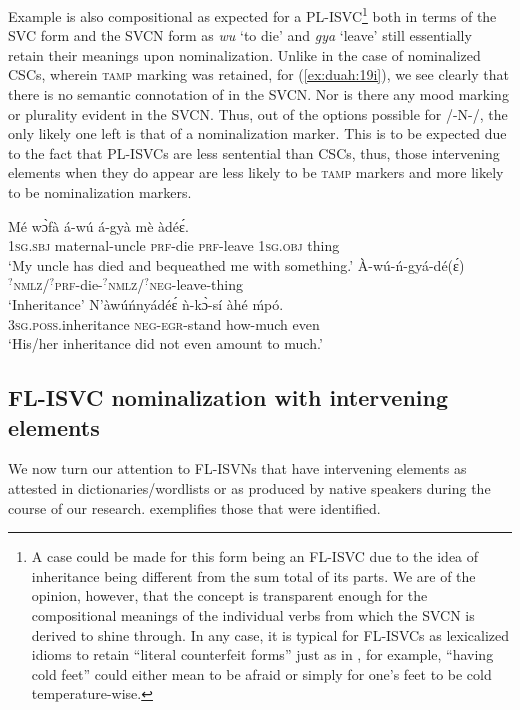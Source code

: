 \documentclass[output=paper,modfonts,nonflat,colorlinks, citecolor=brown, hidelinks]{langsci/langscibook}
\begin{document}
\clearpage
Example  is also compositional as expected for a PL-ISVC\footnote{A case could be made for this form being an FL-ISVC due to the idea of inheritance being different from the sum total of its parts. We are of the opinion, however, that the concept is transparent enough for the compositional meanings of the individual verbs from which the SVCN is derived to shine through. In any case, it is typical for FL-ISVCs as lexicalized idioms to retain “literal counterfeit forms” just as in , for example, “having cold feet” could either mean to be afraid or simply for one’s feet to be cold temperature-wise.} both in terms of the SVC form and the SVCN form as \textit{wu} ‘to die’ and \textit{gya} ‘leave’ still essentially retain their meanings upon nominalization. Unlike in the case of nominalized CSCs, wherein \textsc{tamp} marking was retained, for (\ref{ex:duah:19i}), we see clearly that there is no semantic connotation of  in the SVCN. Nor is there any mood marking or plurality evident in the SVCN. Thus, out of the options possible for /-N-/, the only likely one left is that of a nominalization marker. This is to be expected due to the fact that PL-ISVCs are less sentential than CSCs, thus, those intervening elements when they do appear are less likely to be \textsc{tamp} markers and more likely to be nominalization markers.

\ea\label{ex:duah:19i}
\ea\label{ex:duah:19ia}
\gll Mé wɔ̀fà á-wú á-gyà mè àdéɛ́.\\
1\textsc{sg}.\textsc{sbj}	maternal-uncle \textsc{\textsc{prf}}-die	\textsc{\textsc{prf}}-leave 1\textsc{sg}.\textsc{obj} thing\\
\glt `My uncle has died and bequeathed me with something.'
\ex\label{ex:duah:19ib}
\gll À-wú-ń-gyá-dé(ɛ́)\\
$^{\text{?}}$\textsc{nmlz}/$^{\text{?}}$\textsc{prf}-die-$^{\text{?}}$\textsc{nmlz}/$^{\text{?}}$\textsc{neg}-leave-thing\\
\glt `Inheritance'
\ex\label{ex:duah:19ic}
\gll N’àwúńnyádéɛ́ ǹ-kɔ̀-sí àhé ḿpó.\\
3\textsc{sg}.\textsc{poss}.inheritance \textsc{neg}-\textsc{egr}-stand how-much	even\\
\glt `His/her inheritance did not even amount to much.'
\z
\z


\subsection{FL-ISVC nominalization with intervening elements}
We now turn our attention to FL-ISVNs that have intervening elements as attested in dictionaries/wordlists or as produced by native speakers during the course of our research.  exemplifies those that were identified.
\end{document}
